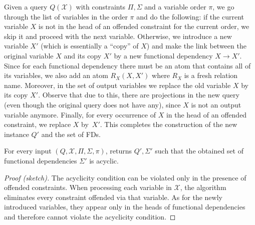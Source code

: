 \documentclass[a4paper,cleveref]{lipics-v2021}
\newcommand{\vset}[1]{\mathcal{#1}}
\begin{document}
Given a query $Q(\vset X)$ with constraints $\Pi, \Sigma$ and a variable order $\pi$, we go through the list of variables in the order $\pi$ and do the following: if the current variable $X$ is not in the head of an offended constraint for the current order, we skip it and proceed with the next variable. Otherwise, we introduce a  new variable $X'$ (which is essentially a ``copy'' of $X$) and make the link between the original variable $X$ and its copy $X'$
 by a new functional dependency $X\rightarrow X'$. Since for each functional dependency there must be an atom that contains all of its variables, we also add an atom $R_X(X, X')$ where $R_X$ is a fresh relation name. 
 Moreover, in the set of output variables we replace the old variable $X$ by its copy $X'$.
Observe that due to this, there are projections in the new query (even though the original query does not have any), since $X$ is not an output variable anymore.
Finally, for every  occurrence of $X$ in the head of an offended constraint, we replace  $X$ by~$X'$. This completes the construction of the new instance $Q'$ and the set of FDs. 

\begin{observation}
	For every input $(Q, \vset X, \Pi, \Sigma, \pi)$, 
	  returns $Q',\Sigma'$ such that 
	the obtained set of functional dependencies $\Sigma'$ is acyclic.
\begin{proof}[Proof (sketch)]
	The acyclicity condition can be violated only in the presence of offended constraints. 
	When processing each variable in $\vset X$, the algorithm eliminates every constraint  offended via that variable. 
	As for the newly introduced variables, they appear only in the heads of functional dependencies and therefore cannot violate the acyclicity condition.
\end{proof}
\end{observation}
\end{document}
